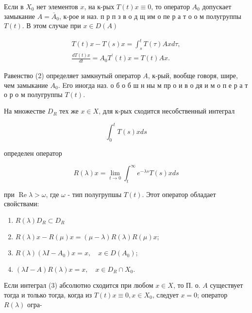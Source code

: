\documentclass[10pt]{article}
\begin{document}
Если в $X_{0}$ нет элементов $x$, на к-рых $T(t) x \equiv 0$, то оператор $A_{0}$ допускает замыкание $A=\bar{A}_{0}$, к-рое и наз. п р п з в о д щ им о пе р а т о о м полугруппы $T(t)$. В этом случае при $x \in D(A)$



\[

\begin{gathered}

T(t) x-T(s) x=\int_{s}^{t} T(\tau) A x d \tau, \\

\frac{d T(t) x}{d t}=A_{0} T^{\prime}(t) x=T(t) A x .

\end{gathered}

\]



Равенство (2) определяет замкнутый оператор $A$, к-рый, вообще говоря, шире, чем замыкание $A_{0}$. Eго иногда наз. о б о б ш н ны м пр о и в о дя и м о п е р а т о р о м полугруппы $T(t)$.



На множестве $D_{R}$ тех же $x \in X$, для к-рых сходится несобственный интеграл



\[

\int_{0}^{t} T(s) x d s

\]



определен оператор



\[

R(\lambda) x=\lim _{t \rightarrow 0} \int_{t}^{\infty} e^{-\lambda s} T(s) x d s

\]



при $\operatorname{Re} \lambda>\omega$, где $\omega$ - тип полугрупшы $T(t)$. Этот оператор обладает свойствами:



\begin{enumerate}

  \item $R(\lambda) D_{R} \subset D_{R}$



  \item $R(\lambda) x-R(\mu) x=(\mu-\lambda) R(\lambda) R(\mu) x$;



  \item $R(\lambda)\left(\lambda I-A_{0}\right) x=x, \quad x \in D\left(A_{0}\right)$;



  \item $(\lambda I-A) R(\lambda) x=x, \quad x \in D_{R} \cap X_{0}$.



\end{enumerate}



Если интеграл (3) абсолютно сходится при любом $x \in X$, то П. о. $A$ существует тогда и только тогда, когда из $T(t) x \equiv 0, x \in X_{0}$, следует $x=0$; оператор $R(\lambda)$ огра-
\end{document}

